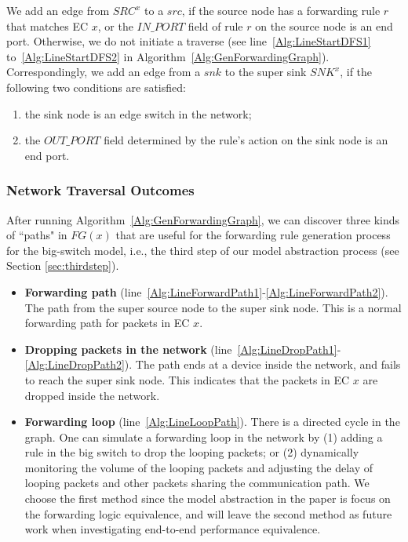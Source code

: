 We add an edge from $SRC^x$ to a $src$, if the source node has a forwarding rule $r$ that matches EC $x$, or the $IN\_PORT$ field of rule $r$ on the source node is an end port.
Otherwise, we do not initiate a traverse (see line~\ref{Alg:LineStartDFS1} to~\ref{Alg:LineStartDFS2} in Algorithm~\ref{Alg:GenForwardingGraph}).
Correspondingly, we add an edge from a $snk$ to the super sink $SNK^x$, if the following two conditions are satisfied:
\begin{enumerate}
\item the sink node is an edge switch in the network;
\item the $OUT\_PORT$ field determined by the rule's action on the sink node is an end port.
\end{enumerate}



\subsubsection{Network Traversal Outcomes}
After running Algorithm~\ref{Alg:GenForwardingGraph}, we can discover three kinds of ``paths" in $FG(x)$ that are useful for the forwarding rule generation process for the big-switch model, i.e., the third step of our model abstraction process (see Section \ref{sec:thirdstep}).

\begin{itemize}
\item \textbf{Forwarding path} (line~\ref{Alg:LineForwardPath1}-\ref{Alg:LineForwardPath2}).
        The path from the super source node to the super sink node.
        This is a normal forwarding path for packets in EC $x$.

\item \textbf{Dropping packets in the network} (line~\ref{Alg:LineDropPath1}-\ref{Alg:LineDropPath2}).
        The path ends at a device inside the network, and fails to reach the super sink node. This indicates that the packets in EC $x$ are dropped inside the network.

\item \textbf{Forwarding loop} (line~\ref{Alg:LineLoopPath}).
        There is a directed cycle in the graph. One can simulate a forwarding loop in the network by (1) adding a rule in the big switch to drop the looping packets; or (2) dynamically monitoring the volume of the looping packets and adjusting the delay of looping packets and other packets sharing the communication path. We choose the first method since the model abstraction in the paper is focus on the forwarding logic equivalence, and will leave the second method as future work when investigating end-to-end performance equivalence.
\end{itemize}


